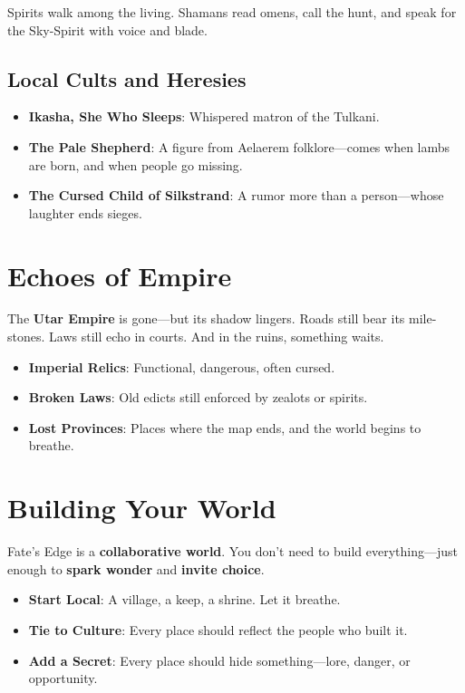 Spirits walk among the living. Shamans read omens, call the hunt, and speak for the Sky-Spirit with voice and blade.

\subsection*{Local Cults and Heresies}

\begin{itemize}
    \item \textbf{Ikasha, She Who Sleeps}: Whispered matron of the Tulkani.
    \item \textbf{The Pale Shepherd}: A figure from Aelaerem folklore—comes when lambs are born, and when people go missing.
    \item \textbf{The Cursed Child of Silkstrand}: A rumor more than a person—whose laughter ends sieges.
\end{itemize}

\section*{Echoes of Empire}

The \textbf{Utar Empire} is gone—but its shadow lingers. Roads still bear its mile-stones. Laws still echo in courts. And in the ruins, something waits.

\begin{itemize}
    \item \textbf{Imperial Relics}: Functional, dangerous, often cursed.
    \item \textbf{Broken Laws}: Old edicts still enforced by zealots or spirits.
    \item \textbf{Lost Provinces}: Places where the map ends, and the world begins to breathe.
\end{itemize}

\section*{Building Your World}

Fate’s Edge is a \textbf{collaborative world}. You don’t need to build everything—just enough to \textbf{spark wonder} and \textbf{invite choice}.

\begin{itemize}
    \item \textbf{Start Local}: A village, a keep, a shrine. Let it breathe.
    \item \textbf{Tie to Culture}: Every place should reflect the people who built it.
    \item \textbf{Add a Secret}: Every place should hide something—lore, danger, or opportunity.
\end{itemize}


